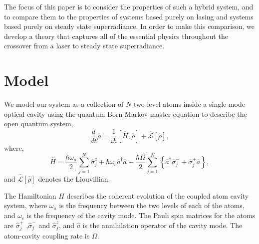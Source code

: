 \documentclass[aps,prl,twocolumn,
superscriptaddress,groupedaddress]{revtex4}
\begin{document}
The focus of this paper is to consider the properties of such a
hybrid system, and to compare them to the properties of systems based
purely on lasing and systems based purely on steady state superradiance.
In order to make this comparison, we develop a theory that captures all
of the essential physics throughout the crossover from a laser to steady
state superradiance.


\section{Model}

We model our system as a collection of $N$ two-level atoms inside a
single mode optical cavity using the quantum Born-Markov master equation
to describe the open quantum system,
\begin{equation}
  \frac{d}{dt} \hat{\rho} =
  \frac{1}{i \hbar} \left[ \hat{H}, \hat{\rho} \right] +
  \hat{\mathcal{L}}\left[ \hat{\rho} \right],
\label{ME1Crossover}
\end{equation}
where,
\begin{equation}
\hat{H} = \frac{\hbar \omega_a}{2} \sum_{j=1}^{N} \hat{\sigma}^{z}_{j}
+ \hbar \omega_c \hat{a}^{\dagger}\hat{a}
+ \frac{\hbar \Omega}{2}  \sum_{j=1}^{N} \left\{
    \hat{a}^{\dagger} \hat{\sigma}^{-}_{j} +
    \hat{\sigma}^{+}_{j} \hat{a} \right\},
\end{equation}
and $\hat{\mathcal{L}}\left[ \hat{\rho} \right]$ denotes the Liouvillian.

The Hamiltonian $H$ describes the coherent evolution of the coupled atom
cavity system, where $\omega_{a}$ is the frequency between the two
levels of each of the atoms, and  $\omega_c$ is the frequency of the
cavity mode. The Pauli spin matrices for the atoms are
$\hat{\sigma}_j^{+}$ ,$\hat{\sigma}_j^{-}$ and $\hat{\sigma}_j^{z}$, and
$\hat{a}$ is the annihilation operator of the cavity mode. The
atom-cavity coupling rate is $\Omega$.
\end{document}
